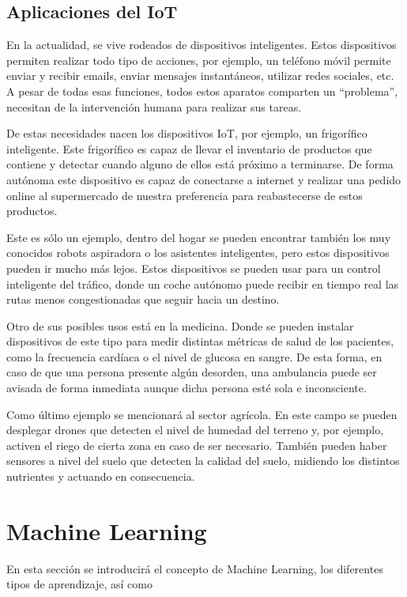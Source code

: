 \subsection{Aplicaciones del IoT}

En la actualidad, se vive rodeados de dispositivos inteligentes. Estos dispositivos  permiten realizar todo tipo de acciones, por ejemplo, un teléfono móvil permite enviar y recibir emails, enviar mensajes instantáneos, utilizar redes sociales, etc. A pesar de todas esas funciones, todos estos aparatos comparten un ``problema'', necesitan de la intervención humana para realizar sus tareas.

De estas necesidades nacen los dispositivos IoT, por ejemplo, un frigorífico inteligente. Este frigorífico es capaz de llevar el inventario de productos que contiene y detectar cuando alguno de ellos está próximo a terminarse. De forma autónoma este dispositivo es capaz de conectarse a internet y realizar una pedido online al supermercado de nuestra preferencia para reabastecerse de estos productos.

Este es sólo un ejemplo, dentro del hogar se pueden encontrar también los muy conocidos robots aspiradora o los asistentes inteligentes, pero estos dispositivos pueden ir mucho más lejos. Estos dispositivos se pueden usar para un control inteligente del tráfico, donde un coche autónomo puede recibir en tiempo real las rutas menos congestionadas que seguir hacia un destino.

Otro de sus posibles usos está en la medicina. Donde se pueden instalar dispositivos de este tipo para medir distintas métricas de salud de los pacientes, como la frecuencia cardíaca o el nivel de glucosa en sangre. De esta forma, en caso de que una persona presente algún desorden, una ambulancia puede ser avisada de forma inmediata aunque dicha persona esté sola e inconsciente.

Como último ejemplo se mencionará al sector agrícola. En este campo se pueden desplegar drones que detecten el nivel de humedad del terreno y, por ejemplo, activen el riego de cierta zona en caso de ser necesario. También pueden haber sensores a nivel del suelo que detecten la calidad del suelo, midiendo los distintos nutrientes y actuando en consecuencia.

\section{Machine Learning}

En esta sección se introducirá el concepto de Machine Learning, los diferentes tipos de aprendizaje, así como 

